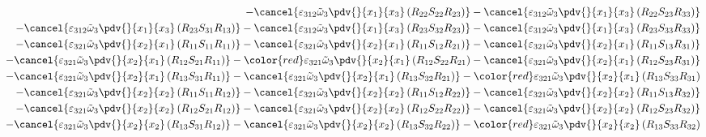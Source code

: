 \begin{equation}
\begin{split}
		-\cancel{\varepsilon_{312}\tilde{\omega}_{3}\pdv{}{x_{1}}{x_{3}}\left(R_{22}S_{22}R_{23}\right)}
		-\cancel{\varepsilon_{312}\tilde{\omega}_{3}\pdv{}{x_{1}}{x_{3}}\left(R_{22}S_{23}R_{33}\right)}\\
		-\cancel{\varepsilon_{312}\tilde{\omega}_{3}\pdv{}{x_{1}}{x_{3}}\left(R_{23}S_{31}R_{13}\right)}
		-\cancel{\varepsilon_{312}\tilde{\omega}_{3}\pdv{}{x_{1}}{x_{3}}\left(R_{23}S_{32}R_{23}\right)}
		-\cancel{\varepsilon_{312}\tilde{\omega}_{3}\pdv{}{x_{1}}{x_{3}}\left(R_{23}S_{33}R_{33}\right)}\\
		-\cancel{\varepsilon_{321}\tilde{\omega}_{3}\pdv{}{x_{2}}{x_{1}}\left(R_{11}S_{11}R_{11}\right)}
		-\cancel{\varepsilon_{321}\tilde{\omega}_{3}\pdv{}{x_{2}}{x_{1}}\left(R_{11}S_{12}R_{21}\right)}
		-\cancel{\varepsilon_{321}\tilde{\omega}_{3}\pdv{}{x_{2}}{x_{1}}\left(R_{11}S_{13}R_{31}\right)}\\
		-\cancel{\varepsilon_{321}\tilde{\omega}_{3}\pdv{}{x_{2}}{x_{1}}\left(R_{12}S_{21}R_{11}\right)}
		-{\color{red}\varepsilon_{321}\tilde{\omega}_{3}\pdv{}{x_{2}}{x_{1}}\left(R_{12}S_{22}R_{21}\right)}
		-\cancel{\varepsilon_{321}\tilde{\omega}_{3}\pdv{}{x_{2}}{x_{1}}\left(R_{12}S_{23}R_{31}\right)}\\
		-\cancel{\varepsilon_{321}\tilde{\omega}_{3}\pdv{}{x_{2}}{x_{1}}\left(R_{13}S_{31}R_{11}\right)}
		-\cancel{\varepsilon_{321}\tilde{\omega}_{3}\pdv{}{x_{2}}{x_{1}}\left(R_{13}S_{32}R_{21}\right)}
		-{\color{red}\varepsilon_{321}\tilde{\omega}_{3}\pdv{}{x_{2}}{x_{1}}\left(R_{13}S_{33}R_{31}\right)}\\
		-\cancel{\varepsilon_{321}\tilde{\omega}_{3}\pdv{}{x_{2}}{x_{2}}\left(R_{11}S_{11}R_{12}\right)}
		-\cancel{\varepsilon_{321}\tilde{\omega}_{3}\pdv{}{x_{2}}{x_{2}}\left(R_{11}S_{12}R_{22}\right)}
		-\cancel{\varepsilon_{321}\tilde{\omega}_{3}\pdv{}{x_{2}}{x_{2}}\left(R_{11}S_{13}R_{32}\right)}\\
		-\cancel{\varepsilon_{321}\tilde{\omega}_{3}\pdv{}{x_{2}}{x_{2}}\left(R_{12}S_{21}R_{12}\right)}
		-\cancel{\varepsilon_{321}\tilde{\omega}_{3}\pdv{}{x_{2}}{x_{2}}\left(R_{12}S_{22}R_{22}\right)}
		-\cancel{\varepsilon_{321}\tilde{\omega}_{3}\pdv{}{x_{2}}{x_{2}}\left(R_{12}S_{23}R_{32}\right)}\\
		-\cancel{\varepsilon_{321}\tilde{\omega}_{3}\pdv{}{x_{2}}{x_{2}}\left(R_{13}S_{31}R_{12}\right)}
		-\cancel{\varepsilon_{321}\tilde{\omega}_{3}\pdv{}{x_{2}}{x_{2}}\left(R_{13}S_{32}R_{22}\right)}
		-{\color{red}\varepsilon_{321}\tilde{\omega}_{3}\pdv{}{x_{2}}{x_{2}}\left(R_{13}S_{33}R_{32}\right)}\\

\end{split}
\end{equation}
